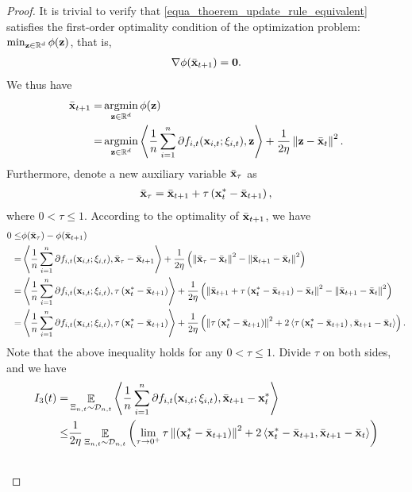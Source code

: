 \documentclass{article}
\begin{document}
\begin{proof}
It is trivial to verify that \eqref{equa_thoerem_update_rule_equivalent} satisfies the first-order optimality condition of the optimization problem: $\min_{{\bf z}\in\mathbb{R}^d} \phi({\bf z})$, that is,
\begin{align}
\nonumber
\nabla \phi(\bar{{\bf x}}_{t+1}) = {\bf 0}.
\end{align} We thus have 
\begin{align}
\nonumber
\bar{\x}_{t+1} = & \argmin_{\z\in\RR^d} \phi(\z) \\ \nonumber
= & \argmin_{\z\in\RR^d} \lrangle{\frac{1}{n}\sum_{i=1}^n \partial f_{i,t}(\x_{i,t};\xi_{i,t}), \z} + \frac{1}{2\eta}\lrnorm{\z - \bar{\x}_t}^2.
\end{align} Furthermore, denote a new auxiliary variable $\bar{{\bf x}}_{\tau}$ as  
\begin{align}
\nonumber
\bar{{\bf x}}_{\tau} = \bar{{\bf x}}_{t+1} + \tau \left( {\bf x}_t^\ast - \bar{{\bf x}}_{t+1} \right),
\end{align} where $0< \tau \le 1$. According to the optimality of $\bar{{\bf x}}_{t+1}$, we have
\begin{align}
\nonumber
0 \le & \phi(\bar{{\bf x}}_{\tau}) - \phi(\bar{{\bf x}}_{t+1}) \\ \nonumber
= & \left\langle\frac{1}{n}\sum_{i=1}^n \partial f_{i,t}({\bf x}_{i,t};\xi_{i,t}), \bar{{\bf x}}_{\tau} - \bar{{\bf x}}_{t+1} \right\rangle + \frac{1}{2\eta}\left(  \left\lVert\bar{{\bf x}}_{\tau} - \bar{{\bf x}}_t\right\rVert^2 - \left\lVert\bar{{\bf x}}_{t+1} - \bar{{\bf x}}_t\right\rVert^2  \right) \\ \nonumber
= & \left\langle\frac{1}{n}\sum_{i=1}^n \partial f_{i,t}({\bf x}_{i,t};\xi_{i,t}), \tau \left( {\bf x}_t^\ast - \bar{{\bf x}}_{t+1} \right) \right\rangle + \frac{1}{2\eta}\left(  \left\lVert\bar{{\bf x}}_{t+1} + \tau \left( {\bf x}_t^\ast - \bar{{\bf x}}_{t+1} \right) - \bar{{\bf x}}_t\right\rVert^2 - \left\lVert\bar{{\bf x}}_{t+1} - \bar{{\bf x}}_t\right\rVert^2  \right) \\ \nonumber
= & \left\langle\frac{1}{n}\sum_{i=1}^n \partial f_{i,t}({\bf x}_{i,t};\xi_{i,t}), \tau \left( {\bf x}_t^\ast - \bar{{\bf x}}_{t+1} \right) \right\rangle + \frac{1}{2\eta}\left(  \left\lVert\tau \left( {\bf x}_t^\ast - \bar{{\bf x}}_{t+1} \right)\right\rVert^2 + 2\left\langle\tau \left( {\bf x}_t^\ast - \bar{{\bf x}}_{t+1} \right), \bar{{\bf x}}_{t+1} - \bar{{\bf x}}_t  \right\rangle  \right).
\end{align} Note that the above inequality holds for any $0< \tau \le 1$. Divide $\tau$ on both sides, and we have
\begin{align}
\nonumber
I_3(t) = & \EE_{ \Xi_{n,t} \sim \Dcal_{n,t} } \lrangle{\frac{1}{n}\sum_{i=1}^n \partial f_{i,t}(\x_{i,t};\xi_{i,t}), \bar{\x}_{t+1} - \x_t^\ast} \\ \nonumber 
\le & \frac{1}{2\eta}\EE_{ \Xi_{n,t} \sim \Dcal_{n,t} }\lrincir{ \lim_{\tau \rightarrow 0^+}\tau \lrnorm{\lrincir{\x_t^\ast - \bar{\x}_{t+1}}}^2 + 2\lrangle{ \x_t^\ast - \bar{\x}_{t+1}, \bar{\x}_{t+1} - \bar{\x}_t } } \\ \nonumber

\end{align}
\end{proof}
\end{document}
